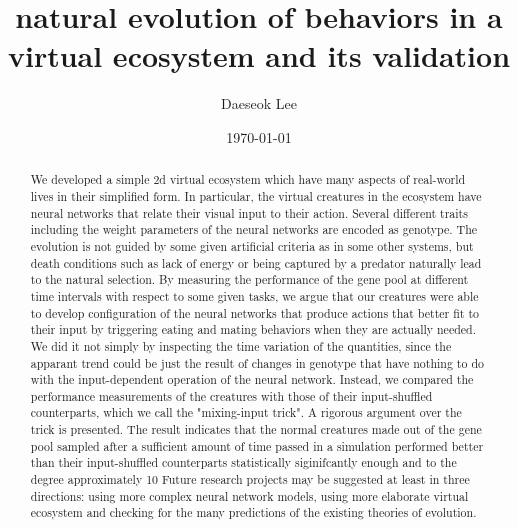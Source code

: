 \documentclass{amsart}
\theoremstyle{definition}
\theoremstyle{remark}
\numberwithin{equation}{section}
\begin{document}
\title{natural evolution of behaviors in a virtual ecosystem and its validation}
\date{\today}
\author{Daeseok Lee}
\begin{abstract}
	We developed a simple 2d virtual ecosystem which have many aspects of real-world lives in their simplified form. In particular, the virtual creatures in the ecosystem have neural networks that relate their visual input to their action. Several different traits including the weight parameters of the neural networks are encoded as genotype. The evolution is not guided by some given  artificial criteria as in some other systems, but death conditions such as lack of energy or being captured by a predator naturally lead to the natural selection.   
	By measuring the performance of the gene pool at different time intervals with respect to some given tasks, we argue that our creatures were able to develop configuration of the neural networks that produce actions that better fit to their input by triggering eating and mating behaviors when they are actually needed. 
	We did it not simply by inspecting the time variation of the quantities, since the apparant trend could be just the result of changes in genotype that have nothing to do with the input-dependent operation of the neural network.
	Instead, we compared the performance measurements of the creatures with those of their input-shuffled counterparts, which we call the "mixing-input trick". A rigorous argument over the trick is presented.
   The result indicates that the normal creatures made out of the gene pool sampled after a sufficient amount of time passed in a simulation performed better than their input-shuffled counterparts statistically siginifcantly enough and to the degree approximately 10%
   Future research projects may be suggested at least in three directions: using more complex neural network models, using more elaborate virtual ecosystem and checking for the many predictions of the existing theories of evolution. 

   
	
\end{abstract}
\maketitle
\end{document}
